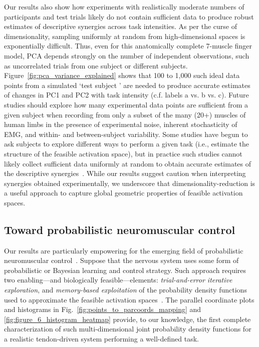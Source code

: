 \documentclass[9pt,twocolumn,twoside,lineno]{pnas-new}
\begin{document}
Our results also show how experiments with realistically moderate numbers of participants and test trials likely do not contain sufficient data to produce robust estimates of descriptive synergies across task intensities. As per the curse of dimensionality, sampling uniformly at random from high-dimensional spaces is exponentially difficult. Thus, even for this anatomically complete 7-muscle finger model, PCA depends strongly on the number of independent observations, such as uncorrelated trials from one subject or different subjects. Figure~\ref{fig:pca_variance_explained} shows that 100 to 1,000 such ideal data points from a simulated `test subject ' are needed to produce accurate estimates of changes in PC1 and PC2 with task intensity (c.f. labels a vs. b vs. c). Future studies should explore how many experimental data points are sufficient from a given subject when recording from only a subset of the many (20+) muscles of human limbs in the presence of experimental noise, inherent stochasticity of EMG, and within- and between-subject variability. Some studies have begun to ask subjects to explore different ways to perform a given task \cite{berger2014effective} (i.e., estimate the structure of the feasible activation space), but in practice such studies cannot likely collect sufficient data uniformly at random to obtain accurate estimates of the descriptive synergies~\cite{kutch2012challenges}. While our results suggest caution when interpreting synergies obtained experimentally, we underscore that dimensionality-reduction is a useful approach to capture global geometric properties of feasible activation spaces.

\subsection*{Toward probabilistic neuromuscular control}

Our results are particularly empowering for the emerging field of probabilistic neuromuscular control~\cite{kording2004bayesian, Kording2014130,berniker2013examination,sanger2011distributed }. Suppose that the nervous system uses some form of probabilistic or Bayesian learning and control strategy. Such approach requires two enabling---and biologically feasible---elements: \emph{trial-and-error iterative exploration}, and \emph{ memory-based exploitation} of the probability density functions used to approximate the feasible activation spaces~\cite{kording2004bayesian}. The parallel coordinate plots and histograms in Fig.~\ref{fig:points_to_parcoords_mapping} and \ref{fig:figure_6_histogram_heatmap} provide, to our knowledge, the first complete~\cite{smith1984efficient,lovasz1999hit} characterization of such multi-dimensional joint probability density functions for a realistic tendon-driven system performing a well-defined task.
\end{document}
